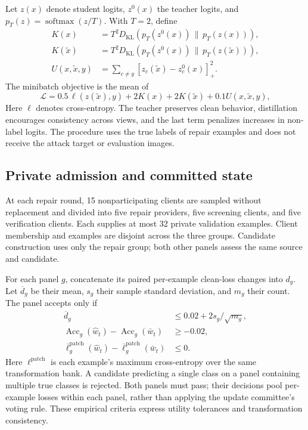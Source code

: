 Let $z(x)$ denote student logits, $z^0(x)$ the teacher logits, and $p_T(z)=\operatorname{softmax}(z/T)$. With $T=2$, define
\begin{align}
 K(x)&=T^2 D_{\mathrm{KL}}\!\left(p_T(z^0(x))\,\|\,p_T(z(x))\right),\\
 K(\widetilde x)&=T^2 D_{\mathrm{KL}}\!\left(p_T(z^0(x))\,\|\,p_T(z(\widetilde x))\right),\\
 U(x,\widetilde x,y)&=\sum_{c\ne y}[z_c(\widetilde x)-z_c^0(x)]_+^2.
\end{align}
The minibatch objective is the mean of
\begin{equation}
 \mathcal L=0.5\,\ell(z(\widetilde x),y)+2K(x)+2K(\widetilde x)
             +0.1U(x,\widetilde x,y),
\end{equation}
Here $\ell$ denotes cross-entropy. The teacher preserves clean behavior, distillation encourages consistency across views, and the last term penalizes increases in non-label logits. The procedure uses the true labels of repair examples and does not receive the attack target or evaluation images.

\subsection{Private admission and committed state}
At each repair round, 15 nonparticipating clients are sampled without replacement and divided into five repair providers, five screening clients, and five verification clients. Each supplies at most 32 private validation examples. Client membership and examples are disjoint across the three groups. Candidate construction uses only the repair group; both other panels assess the same source and candidate.

For each panel $g$, concatenate its paired per-example clean-loss changes into $d_g$. Let $\overline d_g$ be their mean, $s_g$ their sample standard deviation, and $m_g$ their count. The panel accepts only if
\begin{align}
 \overline d_g &\leq 0.02+2s_g/\sqrt{m_g},\\
 \operatorname{Acc}_g(\widehat w_t)-\operatorname{Acc}_g(\bar w_t)&\geq-0.02,\\
 \overline\ell^{\mathrm{patch}}_g(\widehat w_t)
       -\overline\ell^{\mathrm{patch}}_g(\bar w_t)&\leq0.
\end{align}
Here $\ell^{\mathrm{patch}}$ is each example's maximum cross-entropy over the same transformation bank. A candidate predicting a single class on a panel containing multiple true classes is rejected. Both panels must pass; their decisions pool per-example losses within each panel, rather than applying the update committee's voting rule. These empirical criteria express utility tolerances and transformation consistency.

